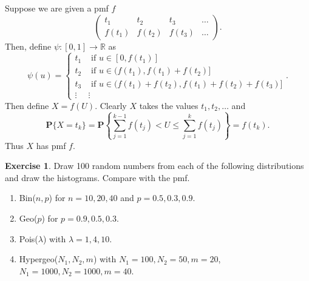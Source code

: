 \documentclass[preprint,  11pt]{amsart}
\newcommand{\para}[1]{\vspace{4mm}\noindent{\bfseries #1:}}
\theoremstyle{plain} %
\theoremstyle{definition} %
\newtheorem{exercise}[theorem]{Exercise}
\begin{document}
\para{General rule} Suppose we are given a pmf $f$
$$
\left(\begin{array}{cccc} t_{1} & t_{2} & t_{3} & \ldots \\ f(t_{1}) & f(t_{2}) & f(t_{3}) & \ldots \end{array} \right).
$$
Then, define $\psi:[0,1]\rightarrow \mathbb{R}$ as
$$
\psi(u) = \begin{cases} t_{1} & \mbox{ if }u\in [0,f(t_{1})] \\
t_{2} & \mbox{ if }u\in (f(t_{1}),f(t_{1})+f(t_{2})] \\
t_{3} & \mbox{ if }u\in (f(t_{1})+f(t_{2}),f(t_{1})+f(t_{2})+f(t_{3})] \\
\vdots & \vdots \end{cases}.
$$
Then define $X=f(U)$. Clearly $X$ takes the values $t_{1},t_{2},\ldots$ and 
$$
\mathbf{P}\{X=t_{k}\} = \mathbf{P}\left\{\sum_{j=1}^{k-1}f(t_{j})<U\le \sum_{j=1}^{k}f(t_{j})\right\} = f(t_{k}).
$$
Thus $X$ has pmf $f$.

\begin{exercise} Draw 100 random numbers from each of the following distributions and draw the histograms. Compare with the pmf.
\begin{enumerate}\setlength\itemsep{6pt}
\item Bin($n,p$) for $n=10,20,40$ and $p=0.5, 0.3, 0.9$.
\item Geo($p$) for $p=0.9,0.5,0.3$.
\item Pois($\lambda$) with $\lambda=1,4,10$.
\item Hypergeo($N_{1},N_{2},m$) with $N_{1}=100,N_{2}=50,m=20$, $N_{1}=1000,N_{2}=1000,m=40$.
\end{enumerate}
\end{exercise}
\end{document}
